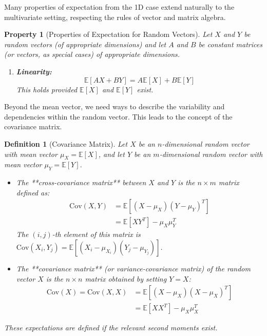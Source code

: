 \documentclass[11pt, a4paper]{article}
\newtheorem{definition}[theorem]{Definition}
\newtheorem{property}[theorem]{Property}
\theoremstyle{definition} %
\newcommand{\E}{\mathbb{E}} %
\newcommand{\Cov}{\mathrm{Cov}} %
\begin{document}
Many properties of expectation from the 1D case extend naturally to the multivariate setting, respecting the rules of vector and matrix algebra.

\begin{property}[Properties of Expectation for Random Vectors]
Let $X$ and $Y$ be random vectors (of appropriate dimensions) and let $A$ and $B$ be constant matrices (or vectors, as special cases) of appropriate dimensions.
\begin{enumerate}
    \item \textbf{Linearity:}
    \begin{equation} \label{eq:linearity_E}
    \E[AX + BY] = A\E[X] + B\E[Y] \tag{2.4}
    \end{equation}
    This holds provided $\E[X]$ and $\E[Y]$ exist.
\end{enumerate}
\end{property}

Beyond the mean vector, we need ways to describe the variability and dependencies within the random vector. This leads to the concept of the covariance matrix.

\begin{definition}[Covariance Matrix]
Let $X$ be an $n$-dimensional random vector with mean vector $\mu_X = \E[X]$, and let $Y$ be an $m$-dimensional random vector with mean vector $\mu_Y = \E[Y]$.
\begin{itemize}
    \item The **cross-covariance matrix** between $X$ and $Y$ is the $n \times m$ matrix defined as:
    \begin{align*} \Cov(X, Y) &= \E[(X - \mu_X)(Y - \mu_Y)^T] \\ &= \E[XY^T] - \mu_X \mu_Y^T \end{align*}
    The $(i, j)$-th element of this matrix is $\Cov(X_i, Y_j) = \E[(X_i - \mu_{X_i})(Y_j - \mu_{Y_j})]$.
    \item The **covariance matrix** (or variance-covariance matrix) of the random vector $X$ is the $n \times n$ matrix obtained by setting $Y=X$:
    \begin{align*} \Cov(X) = \Cov(X, X) &= \E[(X - \mu_X)(X - \mu_X)^T] \\ &= \E[XX^T] - \mu_X \mu_X^T \end{align*}
\end{itemize}
These expectations are defined if the relevant second moments exist.
\end{definition}
\end{document}
